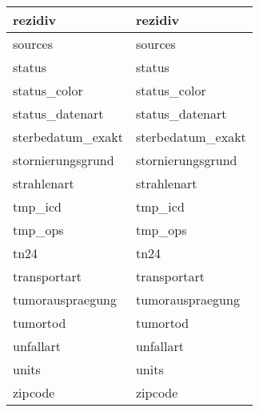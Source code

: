 \begin{longtable}{||p{6cm}|p{7.8cm}||}
  	rezidiv & rezidiv\\ \hline
  	sources & sources\\ \hline
  	status & status\\ \hline
  	status\_color & status\_color\\ \hline
  	status\_datenart & status\_datenart\\ \hline
  	sterbedatum\_exakt & sterbedatum\_exakt\\ \hline
  	stornierungsgrund & stornierungsgrund\\ \hline
  	strahlenart & strahlenart\\ \hline
  	tmp\_icd & tmp\_icd\\ \hline
  	tmp\_ops & tmp\_ops\\ \hline
  	tn24 & tn24\\ \hline
  	transportart & transportart\\ \hline
  	tumorauspraegung & tumorauspraegung\\ \hline
  	tumortod & tumortod\\ \hline
  	unfallart & unfallart\\ \hline
  	units & units\\ \hline
  	zipcode & zipcode\\ \hline
  
  \end{longtable}